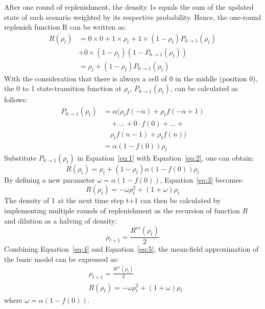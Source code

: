 After one round of replenishment, the density 1s equals the sum of the updated state of each scenario weighted by its respective probability. Hence, the one-round replenish function R can be written as:
\begin{equation}\label{eq:1}
\begin{split}
                R(\rho_{t})
                &= 0 \times 0 + 1 \times \rho_{t} + 1 \times (1 - \rho_{t})P_{0\rightarrow 1}(\rho_{t}) \\
                & + 0 \times (1 - \rho_{t})(1 - P_{0\rightarrow 1}(\rho_{t})) \\
                &=\rho_{t} + (1 - \rho_{t})P_{0\rightarrow 1}(\rho_{t})
\end{split}
\end{equation}
With the consideration that there is always a cell of 0 in the middle (position 0), the 0 to 1 state-transition function at $\rho_{t}$, $P_{0\rightarrow 1}(\rho_{t})$, can be calculated as follows: 
\begin{equation}\label{eq:2}
\begin{split}
                P_{0\rightarrow 1}(\rho_{t})
                &=\alpha(\rho_{t}f(-n)+\rho_{t}f(-n+1)\\
                &\quad+\ldots+0\cdot f(0)+\ldots+\\
                &\quad \rho_{t}f(n-1)+\rho_{t}f(n))\\
                &=\alpha(1-f(0))\rho_{t}
\end{split}
\end{equation}
Substitute $P_{0\rightarrow 1}(\rho_{t})$ in Equation~\ref{eq:1} with Equation~\ref{eq:2}, one can obtain:
\begin{equation}\label{eq:3}
                R(\rho_{t}) = \rho_{t} + (1 - \rho_{t})\alpha(1 - f(0))\rho_{t}
\end{equation}
By defining a new parameter $\omega = \alpha(1 - f(0))$, Equation~\ref{eq:3} becomes:
\begin{equation}\label{eq:4}
                R(\rho_{t}) = -\omega \rho_{t}^{2} + (1 + \omega) \rho_{t}
\end{equation}
The density of 1 at the next time step t+1 can then be calculated by implementing multiple rounds of replenishment as the recursion of function $R$ and dilution as a halving of density:
\begin{equation}\label{eq:5}
                \rho_{t+1} = \frac{R^{rr}(\rho_{t})}{2}
\end{equation}
Combining Equation~\ref{eq:4} and Equation~\ref{eq:5}, the mean-field approximation of the basic model can be expressed as:
\begin{equation}\label{eq:6}
\begin{split}
            &\rho_{t+1} = \frac{R^{rr}(\rho_{t})}{2} \\
            &R(\rho_{t}) = -\omega \rho_{t}^{2} + (1 + \omega) \rho_{t}
\end{split}
\end{equation}
where $\omega = \alpha(1 - f(0))$. 

